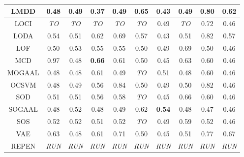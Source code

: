 \begin{table*}[!t]
\begin{center}
\begin{small}
\begin{tabular}{|c|c|c|c|c|c|c|c|c|c|}
\hline
                LMDD &          0.48 &               0.49 &          0.37 &                0.49 &          0.65 &               0.43 &            0.49 &          0.80 &          0.62 \\
\hline
                LOCI &   \textit{TO} &        \textit{TO} &   \textit{TO} &         \textit{TO} &   \textit{TO} &               0.49 &     \textit{TO} &          0.72 &          0.46 \\
\hline
                LODA &          0.54 &               0.51 &          0.62 &                0.69 &          0.57 &               0.43 &            0.51 &          0.82 &          0.57 \\
\hline
                LOF &          0.50 &               0.53 &          0.55 &                0.55 &          0.50 &               0.49 &            0.69 &          0.50 &          0.46 \\
\hline
                MCD &          0.97 &               0.48 & \textbf{0.66} &                0.61 &          0.50 &               0.45 &            0.63 &          0.60 &          0.46 \\
\hline
        MOGAAL &          0.48 &               0.48 &          0.61 &                0.49 &   \textit{TO} &               0.51 &            0.48 &          0.60 &          0.46 \\
\hline
                OCSVM &          0.48 &               0.49 &          0.56 &                0.84 &          0.50 &               0.49 &            0.50 &          0.82 &          0.46 \\
\hline
                SOD &          0.51 &               0.51 &          0.56 &                0.58 &   \textit{TO} &               0.45 &            0.66 &          0.60 &          0.46 \\
\hline
        SOGAAL &          0.48 &               0.52 &          0.48 &                0.49 &          0.62 &      \textbf{0.54} &            0.48 &          0.47 &          0.46 \\
\hline
                SOS &          0.52 &               0.52 &          0.51 &                0.52 &   \textit{TO} &               0.49 &            0.59 &          0.52 &          0.46 \\
\hline
                VAE &          0.63 &               0.48 &          0.61 &                0.71 &          0.50 &               0.45 &            0.51 &          0.77 &          0.67 \\
\hline
REPEN & \textit{RUN} & \textit{RUN} & \textit{RUN} & \textit{RUN} & \textit{RUN} & \textit{RUN} & \textit{RUN} & \textit{RUN} & \textit{RUN} \\
\hline
\end{tabular}
\end{small}
\end{center}
\vskip -0.1in
\end{table*}


